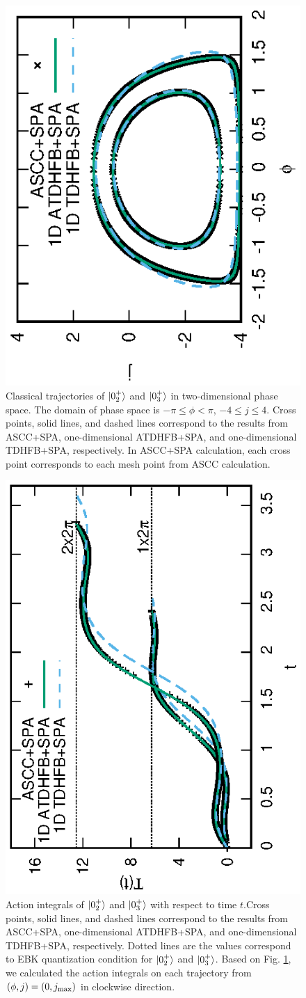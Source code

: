 \documentclass[%
superscriptaddress,
showpacs,
nofootinbib,
amsmath,amssymb,
aps,
prc,
twocolumn,
floatfix ]%
{revtex4-1}
\begin{document}
\begin{figure}[thb]
 \begin{center}
   \includegraphics[height=0.45\textwidth,angle=-90]{N16X3p2trajectory.eps}
 \end{center}
\caption{Classical trajectories of $\ket{0_2^+}$ and $\ket{0_3^+}$ in two-dimensional phase space. The domain of phase space is $-\pi\le\phi<\pi$, $-4\le j\le4$. Cross points, solid lines, and dashed lines correspond to the results from ASCC+SPA, one-dimensional ATDHFB+SPA, and one-dimensional TDHFB+SPA, respectively. In ASCC+SPA calculation, each cross point corresponds to each mesh point from ASCC calculation. }
\label{fig:N16_traj}
\end{figure}
\begin{figure}[thb]
 \begin{center}
   \includegraphics[height=0.5\textwidth,angle=-90]{N16X3p2action.eps}
 \end{center}
\caption{Action integrals of $\ket{0_2^+}$ and $\ket{0_3^+}$ with respect to time $t$.Cross points, solid lines, and dashed lines correspond to the results from ASCC+SPA, one-dimensional ATDHFB+SPA, and one-dimensional TDHFB+SPA, respectively. Dotted lines are the values correspond to EBK quantization condition for $\ket{0_2^+}$ and $\ket{0_3^+}$. Based on Fig. \ref{fig:N16_traj}, we calculated the action integrals on each trajectory from $(\phi,j)=(0,j_{\rm max})$ in clockwise direction. }
\label{fig:N16_tau}
\end{figure}
\end{document}
